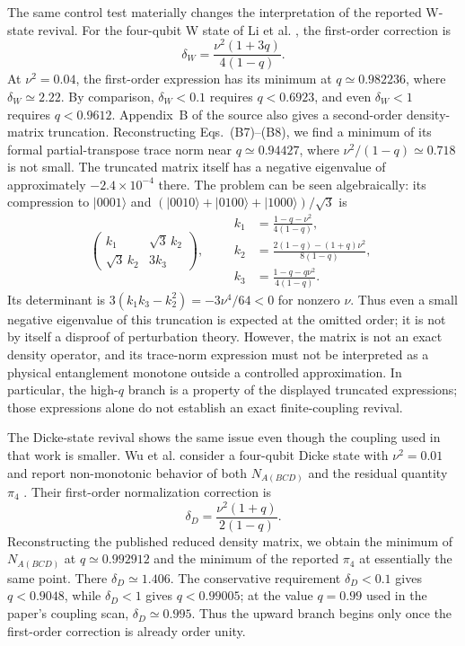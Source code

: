 \documentclass[pdflatex,sn-mathphys-num]{sn-jnl}
\begin{document}
The same control test materially changes the interpretation of the reported W-state revival. For the four-qubit W state of Li et al. \cite{LiWState2025}, the first-order correction is
\begin{equation}
\delta_W=\frac{\nu^2(1+3q)}{4(1-q)}.
\label{eq:w-control}
\end{equation}
At $\nu^2=0.04$, the first-order expression has its minimum at $q\simeq0.982236$, where $\delta_W\simeq2.22$. By comparison, $\delta_W<0.1$ requires $q<0.6923$, and even $\delta_W<1$ requires $q<0.9612$. Appendix~B of the source also gives a second-order density-matrix truncation. Reconstructing Eqs.~(B7)--(B8), we find a minimum of its formal partial-transpose trace norm near $q\simeq0.94427$, where $\nu^2/(1-q)\simeq0.718$ is not small. The truncated matrix itself has a negative eigenvalue of approximately $-2.4\times10^{-4}$ there. The problem can be seen algebraically: its compression to $|0001\rangle$ and $(|0010\rangle+|0100\rangle+|1000\rangle)/\sqrt3$ is
\begin{equation}
\begin{pmatrix}k_1&\sqrt3\,k_2\\\sqrt3\,k_2&3k_3\end{pmatrix},\qquad
\begin{aligned}
k_1&=\frac{1-q-\nu^2}{4(1-q)},\\
k_2&=\frac{2(1-q)-(1+q)\nu^2}{8(1-q)},\\
k_3&=\frac{1-q-q\nu^2}{4(1-q)}.
\end{aligned}
\end{equation}
Its determinant is $3(k_1k_3-k_2^2)=-3\nu^4/64<0$ for nonzero $\nu$. Thus even a small negative eigenvalue of this truncation is expected at the omitted order; it is not by itself a disproof of perturbation theory. However, the matrix is not an exact density operator, and its trace-norm expression must not be interpreted as a physical entanglement monotone outside a controlled approximation. In particular, the high-$q$ branch is a property of the displayed truncated expressions; those expressions alone do not establish an exact finite-coupling revival.

The Dicke-state revival shows the same issue even though the coupling used in that work is smaller. Wu et al. consider a four-qubit Dicke state with $\nu^2=0.01$ and report non-monotonic behavior of both $N_{A(BCD)}$ and the residual quantity $\pi_4$ \cite{WuDicke2026}. Their first-order normalization correction is
\begin{equation}
\delta_D=\frac{\nu^2(1+q)}{2(1-q)}.
\label{eq:dicke-control}
\end{equation}
Reconstructing the published reduced density matrix, we obtain the minimum of $N_{A(BCD)}$ at $q\simeq0.992912$ and the minimum of the reported $\pi_4$ at essentially the same point. There $\delta_D\simeq1.406$. The conservative requirement $\delta_D<0.1$ gives $q<0.9048$, while $\delta_D<1$ gives $q<0.99005$; at the value $q=0.99$ used in the paper's coupling scan, $\delta_D\simeq0.995$. Thus the upward branch begins only once the first-order correction is already order unity.
\end{document}
